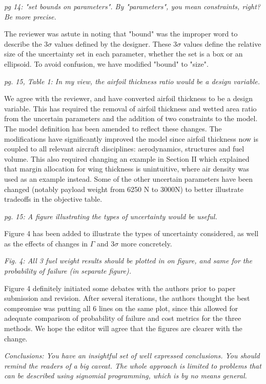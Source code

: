 \documentclass[11pt]{article}
\begin{document}
\textit{pg 14: "set bounds on parameters". By "parameters", you mean constraints, right? Be more precise.}

The reviewer was astute in noting that "bound" was the improper word to describe the $3\sigma$ values
defined by the designer. These $3\sigma$ values define the relative size
of the uncertainty set in each parameter, whether the set is a box or an ellipsoid.
To avoid confusion, we have modified "bound" to "size". 

\textit{pg. 15, Table 1: In my view, the airfoil thickness ratio would be a design variable.}

We agree with the reviewer, and have converted airfoil thickness to be a design variable. 
This has required the removal of airfoil thickness and wetted area ratio from the uncertain parameters
and the addition of two constraints to the model. The model definition has been
amended to reflect these changes. 
The modifications have significantly improved the model since 
airfoil thickness now is coupled to all relevant aircraft disciplines: aerodynamics, structures and 
fuel volume. This also required changing an example in Section II 
which explained that margin allocation for wing thickness 
is unintuitive, where air density was used as an example instead. 
Some of the other uncertain parameters have been changed (notably
payload weight from 6250 N to 3000N) to better illustrate tradeoffs in the objective 
table. 

\textit{pg. 15: A figure illustrating the types of uncertainty would be useful.}

Figure 4 has been added to illustrate the types of uncertainty considered, 
as well as the effects of changes in $\Gamma$ and $3\sigma$ more concretely. 

\textit{Fig. 4: All 3 fuel weight results should be plotted in on figure, and same for the probability of failure (in separate figure).}

Figure 4 definitely initiated some debates with the authors prior to paper submission
and revision. After several iterations, the authors thought the best compromise was putting
all 6 lines on the same plot, since this allowed for adequate comparison of probability of
failure and cost metrics for the three methods. We hope the editor will agree that
the figures are clearer with the change.

\textit{Conclusions: You have an insightful set of well expressed conclusions. You should remind the readers of a big caveat. The whole approach is limited to problems that can be described using signomial programming, which is by no means general.}
\end{document}
